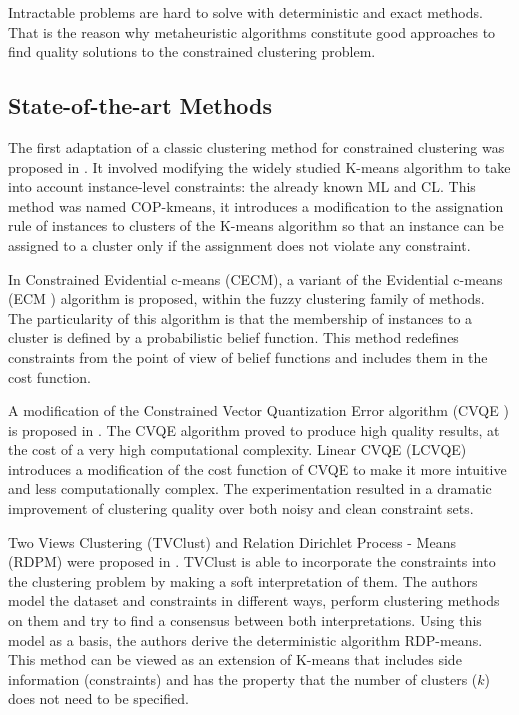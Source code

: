 \documentclass[review]{elsarticle}
\begin{document}
Intractable problems are hard to solve with deterministic and exact methods. That is the reason why metaheuristic algorithms constitute good approaches to find quality solutions to the constrained clustering problem.

\subsection{State-of-the-art Methods} \label{sec:BackSOTA}

The first adaptation of a classic clustering method for constrained clustering was proposed in \cite{wagstaff2001constrained}. It involved modifying the widely studied K-means algorithm to take into account instance-level constraints: the already known ML and CL. This method was named COP-kmeans, it introduces a modification to the assignation rule of instances to clusters of the K-means algorithm so that an instance can be assigned to a cluster only if the assignment does not violate any constraint.

In \cite{antoine2012cecm} Constrained Evidential c-means (CECM), a variant of the Evidential c-means (ECM \cite{masson2008ecm}) algorithm is proposed, within the fuzzy clustering family of methods. The particularity of this algorithm is that the membership of instances to a cluster is defined by a probabilistic belief function. This method redefines constraints from the point of view of belief functions and includes them in the cost function.

A modification of the Constrained Vector Quantization Error algorithm (CVQE \cite{davidson2005clustering}) is proposed in \cite{pelleg2007k}. The CVQE algorithm proved to produce high quality results, at the cost of a very high computational complexity. Linear CVQE (LCVQE) introduces a modification of the cost function of CVQE to make it more intuitive and less computationally complex. The experimentation resulted in a dramatic improvement of clustering quality over both noisy and clean constraint sets.

Two Views Clustering (TVClust) and Relation Dirichlet Process - Means (RDPM) were proposed in \cite{khashabi2015clustering}. TVClust is able to incorporate the constraints into the clustering problem by making a soft interpretation of them. The authors model the dataset and constraints in different ways, perform clustering methods on them and try to find a consensus between both interpretations. Using this model as a basis, the authors derive the deterministic algorithm RDP-means. This method can be viewed as an extension of K-means that includes side information (constraints) and has the property that the number of clusters ($k$) does not need to be specified.
\end{document}
